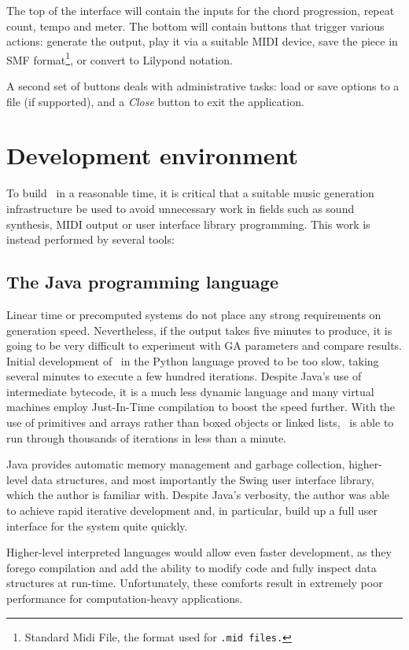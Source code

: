 The top of the interface will contain the inputs for the chord progression, repeat count, tempo and meter. The bottom will contain buttons that trigger various actions: generate the output, play it via a suitable MIDI device, save the piece in SMF format\footnote{Standard Midi File, the format used for \tt{.mid} files.}, or convert to Lilypond notation.

A second set of buttons deals with administrative tasks: load or save options to a file (if supported), and a \emph{Close} button to exit the application.

\section{Development environment}

To build \jg\ in a reasonable time, it is critical that a suitable music generation infrastructure be used to avoid unnecessary work in fields such as sound synthesis, MIDI output or user interface library programming. This work is instead performed by several tools:

\subsection{The Java programming language}

Linear time or precomputed systems do not place any strong requirements on generation speed. Nevertheless, if the output takes five minutes to produce, it is going to be very difficult to experiment with GA parameters and compare results. Initial development of \jg\ in the Python language proved to be too slow, taking several minutes to execute a few hundred iterations. Despite Java's use of intermediate bytecode, it is a much less dynamic language and many virtual machines employ Just-In-Time compilation to boost the speed further. With the use of primitives and arrays rather than boxed objects or linked lists, \jg\ is able to run through thousands of iterations in less than a minute.

Java provides automatic memory management and garbage collection, higher-level data structures, and most importantly the Swing user interface library, which the author is familiar with. Despite Java's verbosity, the author was able to achieve rapid iterative development and, in particular, build up a full user interface for the system quite quickly.

Higher-level interpreted languages would allow even faster development, as they forego compilation and add the ability to modify code and fully inspect data structures at run-time. Unfortunately, these comforts result in extremely poor performance for computation-heavy applications.

